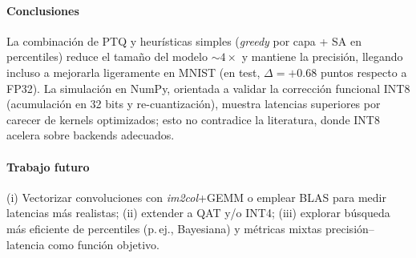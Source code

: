 \paragraph{Conclusiones}
La combinación de PTQ y heurísticas simples (\emph{greedy} por capa + SA en percentiles) reduce el tamaño del modelo $\sim 4\times$ y mantiene la precisión, llegando incluso a mejorarla ligeramente en MNIST (en test, $\Delta=+0.68$ puntos respecto a FP32). La simulación en NumPy, orientada a validar la corrección funcional INT8 (acumulación en 32 bits y re-cuantización), muestra latencias superiores por carecer de kernels optimizados; esto no contradice la literatura, donde INT8 acelera sobre backends adecuados.

\paragraph{Trabajo futuro}
(i) Vectorizar convoluciones con \emph{im2col}+GEMM o emplear BLAS para medir latencias más realistas; (ii) extender a QAT y/o INT4; (iii) explorar búsqueda más eficiente de percentiles (p.\,ej., Bayesiana) y métricas mixtas precisión–latencia como función objetivo.
